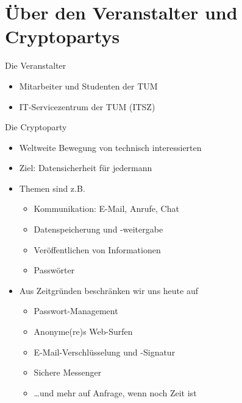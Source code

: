 \section{Über den Veranstalter und Cryptopartys}
\begin{frame}{Die Veranstalter}
  \begin{itemize}
    \item Mitarbeiter und Studenten der TUM
    \item IT-Servicezentrum der TUM (ITSZ)
  \end{itemize}
\end{frame}

\begin{frame}{Die Cryptoparty}
  \begin{itemize}
    \item Weltweite Bewegung von technisch interessierten
    \item Ziel: Datensicherheit für jedermann
    \item Themen sind z.B.
    \begin{itemize}
      \item Kommunikation: E-Mail, Anrufe, Chat
      \item Datenspeicherung und -weitergabe
      \item Veröffentlichen von Informationen
      \item Passwörter
    \end{itemize}
    \item Aus Zeitgründen beschränken wir uns heute auf 
    \begin{itemize}
      \item Passwort-Management
      \item Anonyme(re)s Web-Surfen
      \item E-Mail-Verschlüsselung und -Signatur
      \item Sichere Messenger
      \item \ldots und mehr auf Anfrage, wenn noch Zeit ist
    \end{itemize}
  \end{itemize}
\end{frame}

\endinput
